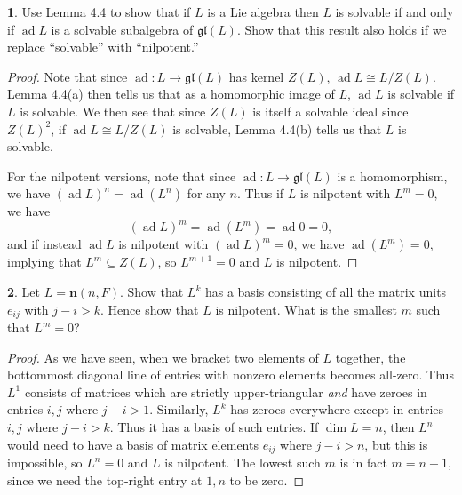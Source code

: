 \documentclass[12pt]{article}
\DeclareMathOperator{\ad}{ad}
\newcommand{\gl}{\mathfrak{gl}}
\theoremstyle{definition}
\newtheorem{ex}{}
\begin{document}
\begin{ex}
	Use Lemma 4.4 to show that if $L$ is a Lie algebra then $L$ is solvable if and only if $\ad L$ is a solvable subalgebra of $\gl(L)$.
	Show that this result also holds if we replace ``solvable'' with ``nilpotent.''
\end{ex}
\begin{proof}
	Note that since $\ad : L \to \gl(L)$ has kernel $Z(L)$, $\ad L \cong L / Z(L)$. Lemma 4.4(a) then tells us that as a homomorphic image of $L$, $\ad L$ is solvable if $L$ is solvable.
	We then see that since $Z(L)$ is itself a solvable ideal since $Z(L)^2$, if $\ad L \cong L/Z(L)$ is solvable, Lemma 4.4(b) tells us that $L$ is solvable.

	For the nilpotent versions, note that since $\ad : L \to \gl(L)$ is a homomorphism, we have $(\ad L)^n = \ad (L^n )$ for any $n$.
	Thus if $L$ is nilpotent with $L^m = 0$, we have \begin{equation*}
		(\ad L)^m = \ad(L^m) = \ad 0 = 0,
	\end{equation*}
	and if instead $\ad L$ is nilpotent with $(\ad L)^m = 0$, we have $\ad (L^m) = 0$, implying that $L^m \subseteq Z(L)$, so $L^{m+1} = 0$ and $L$ is nilpotent.
\end{proof}

\begin{ex}
	Let $L = \mathbf{n}(n, F)$.
	Show that $L^k$ has a basis consisting of all the matrix units $e_{ij}$ with $j - i > k$.
	Hence show that $L$ is nilpotent.
	What is the smallest $m$ such that $L^m = 0$?
\end{ex}
\begin{proof}
	As we have seen, when we bracket two elements of $L$ together, the bottommost diagonal line of entries with nonzero elements becomes all-zero.
	Thus $L^1$ consists of matrices which are strictly upper-triangular \textit{and} have zeroes in entries $i,j$ where $j - i > 1$.
	Similarly, $L^k$ has zeroes everywhere except in entries $i,j$ where $j - i > k$.
	Thus it has a basis of such entries.
	If $\dim L = n$, then $L^n$ would need to have a basis of matrix elements $e_{ij}$ where $j-i > n$, but this is impossible, so $L^n = 0$ and $L$ is nilpotent.
	The lowest such $m$ is in fact $m=n - 1$, since we need the top-right entry at $1, n$ to be zero.
\end{proof}
\end{document}
